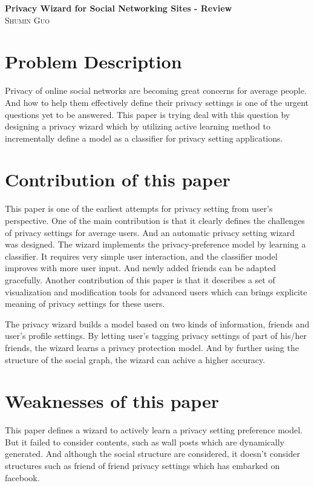 \documentclass[12pt]{article}
\begin{document}
\begin{center}                  %
\textbf{Privacy Wizard for Social Networking Sites - Review} \\ 
\small\textsc{Shumin Guo} \\
\end{center}
\section*{Problem Description}
Privacy of online social networks are becoming great concerns for
average people. And how to help them effectively define their privacy
settings is one of the urgent questions yet to be answered. This paper
is trying deal with this question by designing a privacy wizard which
by utilizing active learning method to incrementally define a model as
a classifier for privacy setting applications. 

\section*{Contribution of this paper}
This paper is one of the earliest attempts for privacy setting from
user's perspective. One of the main contribution is that it clearly
defines the challenges of privacy settings for average users. And an
automatic privacy setting wizard was designed. The wizard implements
the privacy-preference model by learning a classifier. It requires
very simple user interaction, and the classifier model improves with
more user input. And newly added friends can be adapted
gracefully. Another contribution of this paper is that it describes a
set of visualization and modification tools for advanced users which
can brings explicite meaning of privacy settings for these users.

The privacy wizard builds a model based on two kinds of information,
friends and user's profile settings. By letting user's tagging privacy
settings of part of his/her friends, the wizard learns a privacy
protection model. And by further using the structure of the social
graph, the wizard can achive a higher accuracy. 

\section*{Weaknesses of this paper}
This paper defines a wizard to actively learn a privacy setting
preference model. But it failed to consider contents, such as wall
posts which are dynamically generated. And although the social
structure are considered, it doesn't consider structures such as
friend of friend privacy settings which has embarked on facebook. 
 
\end{document}
